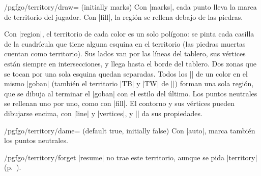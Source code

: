 	\begin{key}{/pgfgo/territory/draw= (initially marks)}
		Con |marks|, cada punto lleva la marca de territorio del jugador. Con |fill|, la región se rellena debajo de las piedras.

		\begin{codeexample}[width=4.75cm]
			\begin{goban}[label = {at = {above, left}}]

			\end{goban}
		\end{codeexample}

		Con |region|, el territorio de cada color es un solo polígono: se pinta cada casilla de la cuadrícula que tiene alguna esquina en el territorio (las piedras muertas cuentan como territorio). Sus lados van por las líneas del tablero, sus vértices están siempre en intersecciones, y llega hasta el borde del tablero. Dos zonas que se tocan por una sola esquina quedan separadas. Todos los |\territory| de un color en el mismo |goban| (también el territorio |TB| y |TW| de |\sgf|) forman una sola región, que se dibuja al terminar el |goban| con el estilo del último. Los puntos neutrales se rellenan uno por uno, como con |fill|. El contorno y sus vértices pueden dibujarse encima, con |line| y |vertices|, y |\pgfgoregion| da sus propiedades.

		\begin{codeexample}[width=4.75cm]
			\begin{goban}[label = {at = {above, left}}]

			\end{goban}
		\end{codeexample}
	\end{key}

	\begin{key}{/pgfgo/territory/dame= (default true, initially false)}
		Con |auto|, marca también los puntos neutrales.
	\end{key}

	\begin{key}{/pgfgo/territory/forget}
		|resume| no trae este territorio, aunque se pida |territory| (p.~\pageref{subsec:recordar}).
	\end{key}

